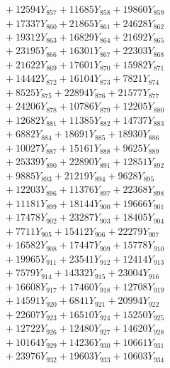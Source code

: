 \documentclass[a4paper,10pt]{article}
\begin{document}
{\begin{align}
&\;  + 12594 Y_{857} + 11685 Y_{858} + 19860 Y_{859} \\[0.3ex]
&\;  + 17337 Y_{860} + 21865 Y_{861} + 24628 Y_{862} \\[0.3ex]
&\;  + 19312 Y_{863} + 16829 Y_{864} + 21692 Y_{865} \\[0.3ex]
&\;  + 23195 Y_{866} + 16301 Y_{867} + 22303 Y_{868} \\[0.5ex]\allowbreak
&\;  + 21622 Y_{869} + 17601 Y_{870} + 15982 Y_{871} \\[0.3ex]
&\;  + 14442 Y_{872} + 16104 Y_{873} + 7821 Y_{874} \\[0.3ex]
&\;  + 8525 Y_{875} + 22894 Y_{876} + 21577 Y_{877} \\[0.3ex]
&\;  + 24206 Y_{878} + 10786 Y_{879} + 12205 Y_{880} \\[0.3ex]
&\;  + 12682 Y_{881} + 11385 Y_{882} + 14737 Y_{883} \\[0.3ex]
&\;  + 6882 Y_{884} + 18691 Y_{885} + 18930 Y_{886} \\[0.3ex]
&\;  + 10027 Y_{887} + 15161 Y_{888} + 9625 Y_{889} \\[0.3ex]
&\;  + 25339 Y_{890} + 22890 Y_{891} + 12851 Y_{892} \\[0.3ex]
&\;  + 9885 Y_{893} + 21219 Y_{894} + 9628 Y_{895} \\[0.3ex]
&\;  + 12203 Y_{896} + 11376 Y_{897} + 22368 Y_{898} \\[0.5ex]\allowbreak
&\;  + 11181 Y_{899} + 18144 Y_{900} + 19666 Y_{901} \\[0.3ex]
&\;  + 17478 Y_{902} + 23287 Y_{903} + 18405 Y_{904} \\[0.3ex]
&\;  + 7711 Y_{905} + 15412 Y_{906} + 22279 Y_{907} \\[0.3ex]
&\;  + 16582 Y_{908} + 17447 Y_{909} + 15778 Y_{910} \\[0.3ex]
&\;  + 19965 Y_{911} + 23541 Y_{912} + 12414 Y_{913} \\[0.3ex]
&\;  + 7579 Y_{914} + 14332 Y_{915} + 23004 Y_{916} \\[0.3ex]
&\;  + 16608 Y_{917} + 17460 Y_{918} + 12708 Y_{919} \\[0.3ex]
&\;  + 14591 Y_{920} + 6841 Y_{921} + 20994 Y_{922} \\[0.3ex]
&\;  + 22607 Y_{923} + 16510 Y_{924} + 15250 Y_{925} \\[0.3ex]
&\;  + 12722 Y_{926} + 12480 Y_{927} + 14620 Y_{928} \\[0.5ex]\allowbreak
&\;  + 10164 Y_{929} + 14236 Y_{930} + 10661 Y_{931} \\[0.3ex]
&\;  + 23976 Y_{932} + 19603 Y_{933} + 10603 Y_{934} \\[0.3ex]

\end{align}}
\end{document}
